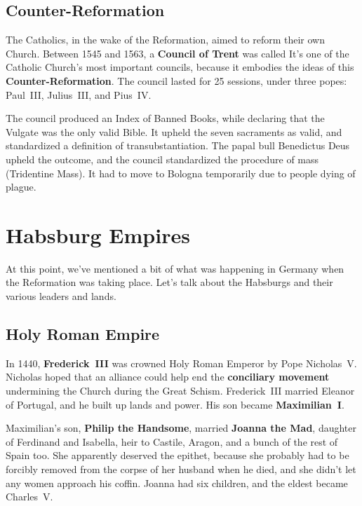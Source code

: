 \subsection*{Counter-Reformation}

The Catholics, in the wake of the Reformation, aimed to reform their own Church.
Between 1545 and 1563, a \textbf{Council of Trent} was called
It's one of the Catholic Church's most important councils,
because it embodies the ideas of this \textbf{Counter-Reformation}.
The council lasted for 25 sessions, under three popes: Paul~III, Julius~III, and Pius~IV\@.

The council produced an Index of Banned Books,
while declaring that the Vulgate was the only valid Bible.
It upheld the seven sacraments as valid,
and standardized a definition of transubstantiation.
The papal bull Benedictus Deus upheld the outcome,
and the council standardized the procedure of mass (Tridentine Mass).
It had to move to Bologna temporarily due to people dying of plague.

\section{Habsburg Empires}

At this point,
we've mentioned a bit of what was happening in Germany when the Reformation was taking place.
Let's talk about the Habsburgs and their various leaders and lands.

\subsection*{Holy Roman Empire}

In 1440, \textbf{Frederick~III} was crowned Holy Roman Emperor by Pope Nicholas~V.
Nicholas hoped that an alliance could help end the \textbf{conciliary movement}
undermining the Church during the Great Schism.
Frederick~III married Eleanor of Portugal, and he built up lands and power.
His son became \textbf{Maximilian~I}.

Maximilian's son, \textbf{Philip the Handsome},
married \textbf{Joanna the Mad}, daughter of Ferdinand and Isabella,
heir to Castile, Aragon, and a bunch of the rest of Spain too.
She apparently deserved the epithet,
because she probably had to be forcibly removed from the corpse of her husband when he died,
and she didn't let any women approach his coffin.
Joanna had six children, and the eldest became Charles~V.

